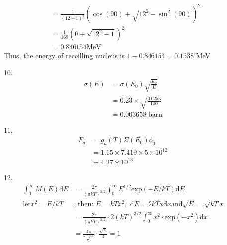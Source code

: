 \documentclass{article}
\begin{document}
\begin{itemize}
\begin{align*}
        &=\frac{1}{(12+1)^2}\left(\cos(90)+\sqrt{12^2-\sin^2(90)}\right)^2\\
        &=\frac{1}{169}\left(0+\sqrt{12^2-1}\right)^2\\
        &=0.846154 \text{MeV}
    \end{align*}
    Thus, the energy of recoilling nucleus is \(1-0.846154=0.1538\) MeV
    \item [10.]
    \begin{align*}
        \sigma(E)&=\sigma(E_0)\sqrt{\frac{E_0}{E}}\\
        &=0.23\times \sqrt{\frac{0.0253}{100}}\\
        &=0.003658 \text{ barn}
    \end{align*}
    \item [11.]
    \begin{align*}
       F_a &= g_a(T)\Sigma(E_0)\phi_0\\
        &=1.15\times 7.419 \times 5\times 10^{12}\\
        &=4.27\times 10^{13}
    \end{align*}
    \item [12.]
    \begin{align*}
        \int_{0}^{\infty}M(E)\text{d}E&=\frac{2\pi}{(\pi k  T)^{3/2}}\int_{0}^{\infty}E^{1/2}\text{exp}(-E/kT)\text{d}E\\
        \text{let} x^2=E/kT&\text{, then: }E=kTx^2,\text{ d}E=2kTx\text{d}x \text{and} \sqrt{E}=\sqrt{kT}x\\
        &=\frac{2\pi}{(\pi k  T)^{3/2}}\cdot 2(kT)^{3/2}\int_{0}^{\infty}x^2\cdot \text{exp}(-x^2)\text{d}x\\
        &=\frac{4\pi}{\pi\sqrt{\pi}}\cdot\frac{\sqrt{\pi}}{4} = 1
    \end{align*}
\end{itemize}
\end{document}
